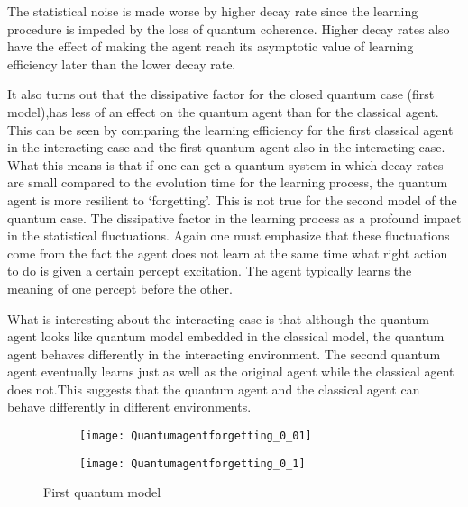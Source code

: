 \documentclass[twocolumn,prX,longbibliography]{revtex4}
\begin{document}
 \indent The statistical noise is made worse by higher decay rate since the learning procedure is impeded by the loss of quantum coherence. Higher decay rates also have the effect of making the agent reach its asymptotic value of learning efficiency later than the lower decay rate. \newline
 
 \indent It also turns out that the dissipative factor for the closed quantum case (first model),has less of an effect on the quantum agent than for the classical agent. This can be seen by comparing the learning efficiency for the first classical agent in the interacting case and the first quantum agent also in the interacting case. What this means is that if one can get a quantum system in which decay rates are small compared to the evolution time for the learning process, the quantum agent is more resilient to `forgetting'. This is not true for the second model of the quantum case. The dissipative factor in the learning process as a profound impact in the statistical fluctuations. Again one must emphasize that these fluctuations come from the fact the agent does not learn at the same time what right action to do is given a certain percept excitation. The agent typically learns the meaning of one percept before the other.\newline
 
  \indent What is interesting about the interacting case is that although the quantum agent looks like quantum model embedded in the classical model, the quantum agent behaves differently in the interacting environment. The second quantum agent eventually learns just as well as the original agent while the classical agent does not.This suggests that the quantum agent and the classical agent can behave differently in different environments.

\onecolumngrid
\begin{center}
	 \begin{figure}[H]
	
	   \begin{subfigure}{0.8 \textwidth}
	   	   \texttt{[image: Quantumagentforgetting\_0\_01]}
	   \end{subfigure}
	    
		\begin{subfigure}{0.8\textwidth}
		  	\texttt{[image: Quantumagentforgetting\_0\_1]}
		\end{subfigure}
	
	  \caption{First quantum model}
	 \end{figure}
\end{center}
\end{document}
